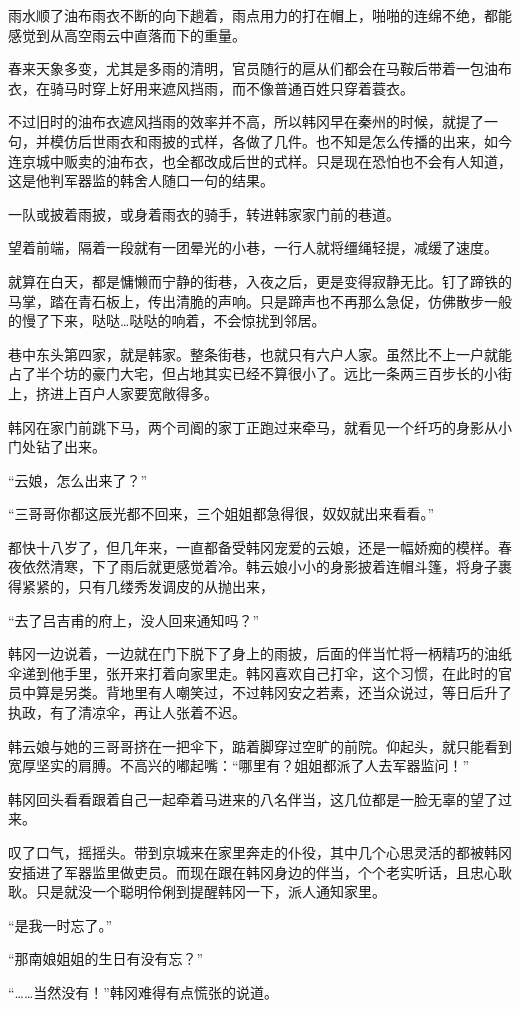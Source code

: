 雨水顺了油布雨衣不断的向下趟着，雨点用力的打在帽上，啪啪的连绵不绝，都能感觉到从高空雨云中直落而下的重量。

春来天象多变，尤其是多雨的清明，官员随行的扈从们都会在马鞍后带着一包油布衣，在骑马时穿上好用来遮风挡雨，而不像普通百姓只穿着蓑衣。

不过旧时的油布衣遮风挡雨的效率并不高，所以韩冈早在秦州的时候，就提了一句，并模仿后世雨衣和雨披的式样，各做了几件。也不知是怎么传播的出来，如今连京城中贩卖的油布衣，也全都改成后世的式样。只是现在恐怕也不会有人知道，这是他判军器监的韩舍人随口一句的结果。

一队或披着雨披，或身着雨衣的骑手，转进韩家家门前的巷道。

望着前端，隔着一段就有一团晕光的小巷，一行人就将缰绳轻提，减缓了速度。

就算在白天，都是慵懒而宁静的街巷，入夜之后，更是变得寂静无比。钉了蹄铁的马掌，踏在青石板上，传出清脆的声响。只是蹄声也不再那么急促，仿佛散步一般的慢了下来，哒哒…哒哒的响着，不会惊扰到邻居。

巷中东头第四家，就是韩家。整条街巷，也就只有六户人家。虽然比不上一户就能占了半个坊的豪门大宅，但占地其实已经不算很小了。远比一条两三百步长的小街上，挤进上百户人家要宽敞得多。

韩冈在家门前跳下马，两个司阍的家丁正跑过来牵马，就看见一个纤巧的身影从小门处钻了出来。

“云娘，怎么出来了？”

“三哥哥你都这辰光都不回来，三个姐姐都急得很，奴奴就出来看看。”

都快十八岁了，但几年来，一直都备受韩冈宠爱的云娘，还是一幅娇痴的模样。春夜依然清寒，下了雨后就更感觉着冷。韩云娘小小的身影披着连帽斗篷，将身子裹得紧紧的，只有几缕秀发调皮的从抛出来，

“去了吕吉甫的府上，没人回来通知吗？”

韩冈一边说着，一边就在门下脱下了身上的雨披，后面的伴当忙将一柄精巧的油纸伞递到他手里，张开来打着向家里走。韩冈喜欢自己打伞，这个习惯，在此时的官员中算是另类。背地里有人嘲笑过，不过韩冈安之若素，还当众说过，等日后升了执政，有了清凉伞，再让人张着不迟。

韩云娘与她的三哥哥挤在一把伞下，踮着脚穿过空旷的前院。仰起头，就只能看到宽厚坚实的肩膊。不高兴的嘟起嘴：“哪里有？姐姐都派了人去军器监问！”

韩冈回头看看跟着自己一起牵着马进来的八名伴当，这几位都是一脸无辜的望了过来。

叹了口气，摇摇头。带到京城来在家里奔走的仆役，其中几个心思灵活的都被韩冈安插进了军器监里做吏员。而现在跟在韩冈身边的伴当，个个老实听话，且忠心耿耿。只是就没一个聪明伶俐到提醒韩冈一下，派人通知家里。

“是我一时忘了。”

“那南娘姐姐的生日有没有忘？”

“……当然没有！”韩冈难得有点慌张的说道。

